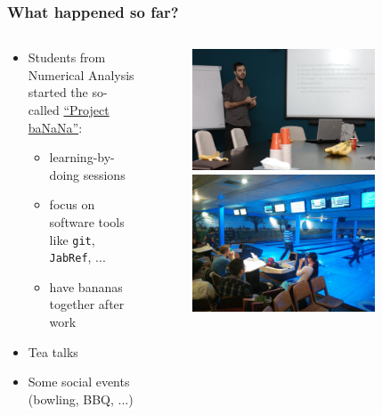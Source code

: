 \documentclass{beamer}
\begin{document}
\begin{frame}
\frametitle{What happened so far?}
\begin{columns}
 \begin{column}{0.8\textwidth}
 \begin{itemize}
  \item Students from Numerical Analysis started the so-called \href{http://projectbanana.github.io}{``Project ba{\color{red}NaN}a''}:
  \begin{itemize}
  \item learning-by-doing sessions
  \item focus on software tools like \texttt{git}, \texttt{JabRef}, ...
  \item have bananas together after work
 \end{itemize}
 \item Tea talks
 \item Some social events (bowling, BBQ, ...)
 \end{itemize}
 \end{column}

 \begin{column}{0.4\textwidth}
  \begin{figure}[t]
  \centering
  \includegraphics[width=0.8\textwidth]{images/moritz} \vspace{0.6cm}\\
  \includegraphics[width=0.8\textwidth]{images/bowling}
  \end{figure}
 \end{column}
 \end{columns}
\end{frame}
\end{document}
